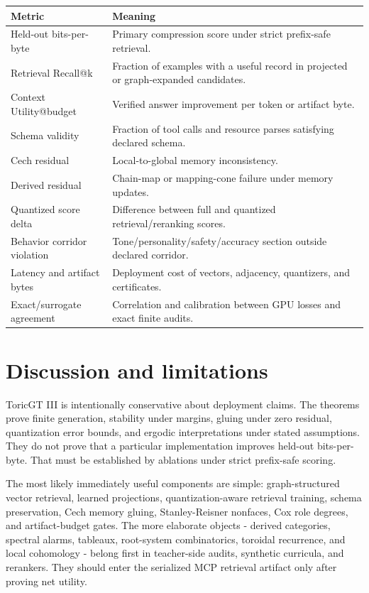 \documentclass[11pt]{article}
\numberwithin{equation}{section}
\begin{document}
\begin{longtable}{p{}p{}}
\toprule
Metric & Meaning\\
\midrule
Held-out bits-per-byte & Primary compression score under strict prefix-safe retrieval.\\
Retrieval Recall@k & Fraction of examples with a useful record in projected or graph-expanded candidates.\\
Context Utility@budget & Verified answer improvement per token or artifact byte.\\
Schema validity & Fraction of tool calls and resource parses satisfying declared schema.\\
Cech residual & Local-to-global memory inconsistency.\\
Derived residual & Chain-map or mapping-cone failure under memory updates.\\
Quantized score delta & Difference between full and quantized retrieval/reranking scores.\\
Behavior corridor violation & Tone/personality/safety/accuracy section outside declared corridor.\\
Latency and artifact bytes & Deployment cost of vectors, adjacency, quantizers, and certificates.\\
Exact/surrogate agreement & Correlation and calibration between GPU losses and exact finite audits.\\
\bottomrule
\end{longtable}

\section{Discussion and limitations}
ToricGT III is intentionally conservative about deployment claims. The theorems prove finite generation, stability under margins, gluing under zero residual, quantization error bounds, and ergodic interpretations under stated assumptions. They do not prove that a particular implementation improves held-out bits-per-byte. That must be established by ablations under strict prefix-safe scoring.

The most likely immediately useful components are simple: graph-structured vector retrieval, learned projections, quantization-aware retrieval training, schema preservation, Cech memory gluing, Stanley-Reisner nonfaces, Cox role degrees, and artifact-budget gates. The more elaborate objects - derived categories, spectral alarms, tableaux, root-system combinatorics, toroidal recurrence, and local cohomology - belong first in teacher-side audits, synthetic curricula, and rerankers. They should enter the serialized MCP retrieval artifact only after proving net utility.
\end{document}
